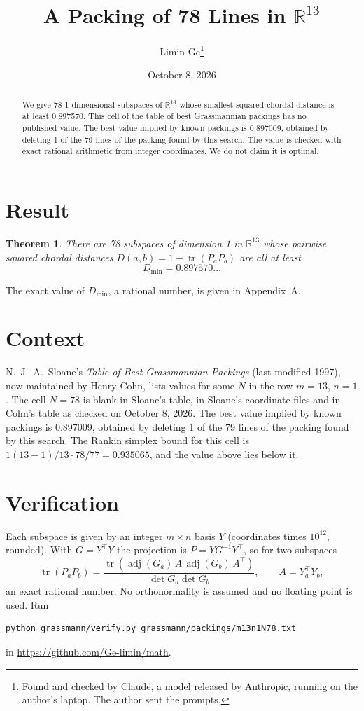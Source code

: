 \documentclass[11pt,a4paper]{article}
\title{A Packing of 78 Lines in $\mathbb{R}^{13}$}
\author{Limin Ge\thanks{Found and checked by Claude, a model released by Anthropic, running on the author's laptop. The author sent the prompts.}}
\date{October 8, 2026}
\newtheorem*{theorem}{Theorem}
\begin{document}
\maketitle
\begin{abstract}
We give 78 1-dimensional subspaces of $\mathbb{R}^{13}$ whose smallest squared chordal distance is at least 0.897570. This cell of the table of best Grassmannian packings has no published value. The best value implied by known packings is 0.897009, obtained by deleting 1 of the 79 lines of the packing found by this search. The value is checked with exact rational arithmetic from integer coordinates. We do not claim it is optimal.
\end{abstract}

\section{Result}
\begin{theorem}
There are 78 subspaces of dimension 1 in $\mathbb{R}^{13}$ whose pairwise squared chordal distances $D(a,b) = 1 - \operatorname{tr}(P_aP_b)$ are all at least
\[ D_{\min} = 0.897570\ldots \]
\end{theorem}
The exact value of $D_{\min}$, a rational number, is given in Appendix~A.


\section{Context}
N.~J.~A.~Sloane's \emph{Table of Best Grassmannian Packings} (last modified 1997), now maintained by Henry Cohn, lists values for some $N$ in the row $m=13$, $n=1$. The cell $N=78$ is blank in Sloane's table, in Sloane's coordinate files and in Cohn's table as checked on October 8, 2026. The best value implied by known packings is 0.897009, obtained by deleting 1 of the 79 lines of the packing found by this search. The Rankin simplex bound for this cell is $1(13-1)/13\cdot 78/77 = 0.935065$, and the value above lies below it.


\section{Verification}
Each subspace is given by an integer $m\times n$ basis $Y$ (coordinates times $10^{12}$, rounded). With $G=Y^\top Y$ the projection is $P=YG^{-1}Y^\top$, so for two subspaces
\[ \operatorname{tr}(P_aP_b)=\frac{\operatorname{tr}(\operatorname{adj}(G_a)\,A\,\operatorname{adj}(G_b)\,A^\top)}{\det G_a\det G_b},\qquad A=Y_a^\top Y_b, \]
an exact rational number. No orthonormality is assumed and no floating point is used. Run
\begin{verbatim}
python grassmann/verify.py grassmann/packings/m13n1N78.txt
\end{verbatim}
in \url{https://github.com/Ge-limin/math}.
\end{document}
